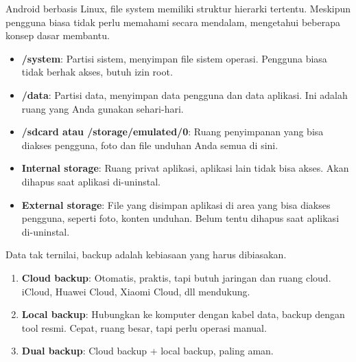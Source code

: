
Android berbasis Linux, file system memiliki struktur hierarki tertentu. Meskipun pengguna biasa tidak perlu memahami secara mendalam, mengetahui beberapa konsep dasar membantu.


\begin{itemize}
  \item \textbf{/system}: Partisi sistem, menyimpan file sistem operasi. Pengguna biasa tidak berhak akses, butuh izin root.
  \item \textbf{/data}: Partisi data, menyimpan data pengguna dan data aplikasi. Ini adalah ruang yang Anda gunakan sehari-hari.
  \item \textbf{/sdcard atau /storage/emulated/0}: Ruang penyimpanan yang bisa diakses pengguna, foto dan file unduhan Anda semua di sini.
\end{itemize}


\begin{itemize}
  \item \textbf{Internal storage}: Ruang privat aplikasi, aplikasi lain tidak bisa akses. Akan dihapus saat aplikasi di-uninstal.
  \item \textbf{External storage}: File yang disimpan aplikasi di area yang bisa diakses pengguna, seperti foto, konten unduhan. Belum tentu dihapus saat aplikasi di-uninstal.
\end{itemize}


Data tak ternilai, backup adalah kebiasaan yang harus dibiasakan.


\begin{enumerate}
  \item \textbf{Cloud backup}: Otomatis, praktis, tapi butuh jaringan dan ruang cloud. iCloud, Huawei Cloud, Xiaomi Cloud, dll mendukung.
  \item \textbf{Local backup}: Hubungkan ke komputer dengan kabel data, backup dengan tool resmi. Cepat, ruang besar, tapi perlu operasi manual.
  \item \textbf{Dual backup}: Cloud backup + local backup, paling aman.
\end{enumerate}


